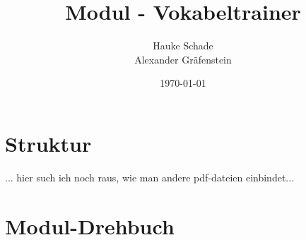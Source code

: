 \documentclass[a4paper]{scrartcl}
\title{Modul - Vokabeltrainer}
\author{Hauke Schade\\Alexander Gräfenstein}
\date{\today}
\begin{document}
	\maketitle
	\newpage

	\section{Struktur}
	... hier such ich noch raus, wie man andere pdf-dateien einbindet...

	\section{Modul-Drehbuch}
	
\end{document}
